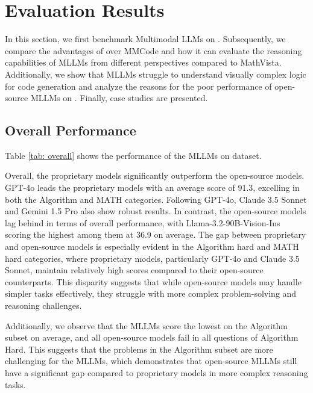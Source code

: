 
\section{Evaluation Results}


In this section, we first benchmark Multimodal LLMs on \benchmark. Subsequently, we compare the advantages of \benchmark over MMCode and how it can evaluate the reasoning capabilities of MLLMs from different perspectives compared to MathVista. Additionally, we show that MLLMs struggle to understand visually complex logic for code generation and analyze the reasons for the poor performance of open-source MLLMs on \benchmark. Finally, case studies are presented.




\subsection{Overall Performance}
Table \ref{tab: overall} shows the performance of the MLLMs on \benchmark dataset.


Overall, the proprietary models significantly outperform the open-source models. GPT-4o leads the proprietary models with an average score of 91.3, excelling in both the Algorithm and MATH categories. Following GPT-4o, Claude 3.5 Sonnet and Gemini 1.5 Pro also show robust results. In contrast, the open-source models lag behind in terms of overall performance, with Llama-3.2-90B-Vision-Ins scoring the highest among them at 36.9 on average. 
The gap between proprietary and open-source models is especially evident in the Algorithm hard and MATH hard categories, where proprietary models, particularly GPT-4o and Claude 3.5 Sonnet, maintain relatively high scores compared to their open-source counterparts. This disparity suggests that while open-source models may handle simpler tasks effectively, they struggle with more complex problem-solving and reasoning challenges.

Additionally, we observe that the MLLMs score the lowest on the Algorithm subset on average, and all open-source models fail in all questions of Algorithm Hard. This suggests that the problems in the Algorithm subset are more challenging for the MLLMs, which demonstrates that open-source MLLMs still have a significant gap compared to proprietary models in more complex reasoning tasks.


